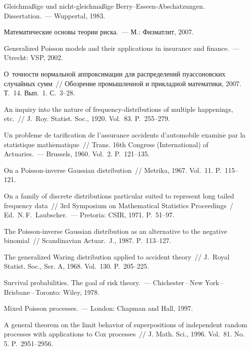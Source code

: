 \begin{multicols}{2}
{{\begin{thebibliography}{99}
  Gleichm$\ddot{\mbox{a}}${\ss}ige und
nicht-gleichm$\ddot{\mbox{a}}${\ss}ige Berry--Esseen-Absch$\ddot{\mbox{a}}$tzungen.
Dissertation.~--- Wuppertal, 1983.

  
Математические основы теории риска.~--- М.: Физматлит, 2007.

   Generalized Poisson models
and their applications in insurance and finance.~--- Utrecht: VSP, 2002.

  О~точности нормальной аппроксимации для
распределений пуассоновских случайных сумм~// Обозрение
промышленной и прикладной математики, 2007. Т.~14. Вып.~1. С.~3--28.

  An inquiry into the nature of
frequency-distributions of multiple happenings, etc.~// J.~Roy.
Statist. Soc., 1920. Vol.~83. P.~255--279.

  Un probl$\acute{\mbox{e}}$me de tarification de l'assurance
accidents d'automobile examin$\acute{\mbox{e}}$ par la statistique math$\acute{\mbox{e}}$matique~// 
Trans. 16th  Congress (International) of Actuaries.~--- Brussels,
1960. Vol.~2. P.~121--135.

  On a Poisson-inverse Gaussian distribution~//
Metrika, 1967. Vol.~11. P.~115--121.

  On a family of discrete distributions
particular suited to represent long tailed frequency data~// 
3rd Symposium on Mathematical Statistics Proceedings~/ Ed.\ N.\,F.~Laubscher.~---
Pretoria: CSIR, 1971. P.~51--97.

  The Poisson-inverse Gaussian distribution
as an alternative to the negative binomial~// Scandinavian Actuar.~J., 1987. P.~113--127.

  The generalized Waring distribution applied to
accident theory~// J.~Royal Statist. Soc., Ser. A, 1968. Vol.~130. P.~205--225.

  Survival probabilities. The goal of risk
theory.~--- Chichester\,--\,New York\,--\,Brisbane\,--\,Toronto: Wiley, 1978.

  Mixed Poisson processes.~--- London:
Chapman and Hall, 1997.

  A general theorem on the limit behavior of
superpositions of independent random processes with applications
to Cox processes~// J. Math. Sci., 1996. Vol.~81. No.\,5. P.~2951--2956.


\end{thebibliography}}}
\end{multicols}
